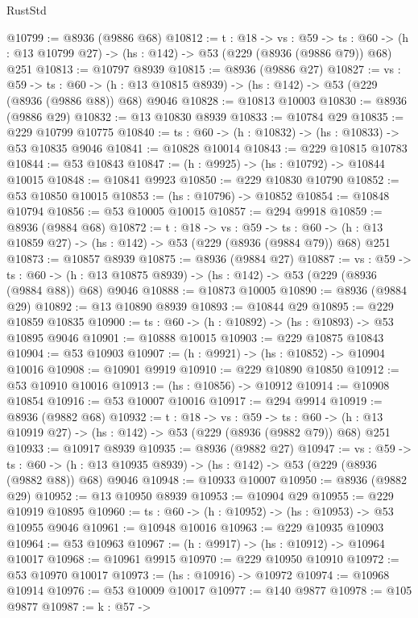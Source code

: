 \begin{lexlean}{RustStd}
\begin{coremodule}
@10799 := @8936 (@9886 @68)
@10812 := {t : @18} ->
  {vs : @59} ->
  {ts : @60} -> (h : @13 @10799 @27) -> (hs : @142) -> @53 (@229 (@8936 (@9886 @79)) @68) @251
@10813 := @10797 @8939
@10815 := @8936 (@9886 @27)
@10827 := {vs : @59} ->
  {ts : @60} -> (h : @13 @10815 @8939) -> (hs : @142) -> @53 (@229 (@8936 (@9886 @88)) @68) @9046
@10828 := @10813 @10003
@10830 := @8936 (@9886 @29)
@10832 := @13 @10830 @8939
@10833 := @10784 @29
@10835 := @229 @10799 @10775
@10840 := {ts : @60} -> (h : @10832) -> (hs : @10833) -> @53 @10835 @9046
@10841 := @10828 @10014
@10843 := @229 @10815 @10783
@10844 := @53 @10843
@10847 := (h : @9925) -> (hs : @10792) -> @10844 @10015
@10848 := @10841 @9923
@10850 := @229 @10830 @10790
@10852 := @53 @10850 @10015
@10853 := (hs : @10796) -> @10852
@10854 := @10848 @10794
@10856 := @53 @10005 @10015
@10857 := @294 @9918
@10859 := @8936 (@9884 @68)
@10872 := {t : @18} ->
  {vs : @59} ->
  {ts : @60} -> (h : @13 @10859 @27) -> (hs : @142) -> @53 (@229 (@8936 (@9884 @79)) @68) @251
@10873 := @10857 @8939
@10875 := @8936 (@9884 @27)
@10887 := {vs : @59} ->
  {ts : @60} -> (h : @13 @10875 @8939) -> (hs : @142) -> @53 (@229 (@8936 (@9884 @88)) @68) @9046
@10888 := @10873 @10005
@10890 := @8936 (@9884 @29)
@10892 := @13 @10890 @8939
@10893 := @10844 @29
@10895 := @229 @10859 @10835
@10900 := {ts : @60} -> (h : @10892) -> (hs : @10893) -> @53 @10895 @9046
@10901 := @10888 @10015
@10903 := @229 @10875 @10843
@10904 := @53 @10903
@10907 := (h : @9921) -> (hs : @10852) -> @10904 @10016
@10908 := @10901 @9919
@10910 := @229 @10890 @10850
@10912 := @53 @10910 @10016
@10913 := (hs : @10856) -> @10912
@10914 := @10908 @10854
@10916 := @53 @10007 @10016
@10917 := @294 @9914
@10919 := @8936 (@9882 @68)
@10932 := {t : @18} ->
  {vs : @59} ->
  {ts : @60} -> (h : @13 @10919 @27) -> (hs : @142) -> @53 (@229 (@8936 (@9882 @79)) @68) @251
@10933 := @10917 @8939
@10935 := @8936 (@9882 @27)
@10947 := {vs : @59} ->
  {ts : @60} -> (h : @13 @10935 @8939) -> (hs : @142) -> @53 (@229 (@8936 (@9882 @88)) @68) @9046
@10948 := @10933 @10007
@10950 := @8936 (@9882 @29)
@10952 := @13 @10950 @8939
@10953 := @10904 @29
@10955 := @229 @10919 @10895
@10960 := {ts : @60} -> (h : @10952) -> (hs : @10953) -> @53 @10955 @9046
@10961 := @10948 @10016
@10963 := @229 @10935 @10903
@10964 := @53 @10963
@10967 := (h : @9917) -> (hs : @10912) -> @10964 @10017
@10968 := @10961 @9915
@10970 := @229 @10950 @10910
@10972 := @53 @10970 @10017
@10973 := (hs : @10916) -> @10972
@10974 := @10968 @10914
@10976 := @53 @10009 @10017
@10977 := @140 @9877
@10978 := @105 @9877
@10987 := {k : @57} ->

\end{coremodule}
\end{lexlean}
